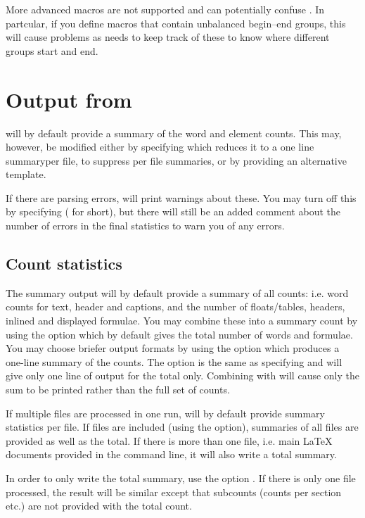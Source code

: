 \documentclass{article}
\begin{document}
More advanced macros are not supported and can potentially confuse \TeXcount{}. In partcular, if you define macros that contain unbalanced begin--end groups, this will cause problems as \TeXcount{} needs to keep track of these to know where different groups start and end.


\section{Output from \TeXcount{}}

\TeXcount{} will by default provide a summary of the word and element counts. This may, however, be modified either by specifying  which reduces it to a one line summaryper file,  to suppress per file summaries, or by providing an alternative template.

If there are parsing errors, \TeXcount{} will print warnings about these. You may turn off this by specifying  ( for short), but there will still be an added comment about the number of errors in the final statistics to warn you of any errors.

\subsection{Count statistics}

The summary output will by default provide a summary of all counts: i.e. word counts for text, header and captions, and the number of floats/tables, headers, inlined and displayed formulae. You may combine these into a summary count by using the  option which by default gives the total number of words and formulae. You may choose briefer output formats by using the  option which produces a one-line summary of the counts. The option  is the same as specifying  and will give only one line of output for the total only. Combining  with  will cause only the sum to be printed rather than the full set of counts.

If multiple files are processed in one run, \TeXcount{} will by default provide summary statistics per file. If files are included (using the  option), summaries of all files are provided as well as the total. If there is more than one file, i.e. main \LaTeX{} documents provided in the command line, it will also write a total summary.

In order to only write the total summary, use the option . If there is only one file processed, the result will be similar except that subcounts (counts per section etc.) are not provided with the total count.
\end{document}

